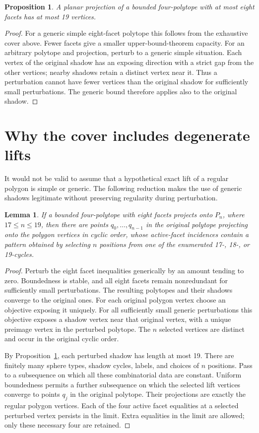 \documentclass[11pt]{article}
\newtheorem{lemma}[theorem]{Lemma}
\newtheorem{proposition}[theorem]{Proposition}
\theoremstyle{definition}
\begin{document}
\begin{proposition}\label{prop:19}
A planar projection of a bounded four-polytope with at most eight facets has at most 19 vertices.
\end{proposition}
\begin{proof}
For a generic simple eight-facet polytope this follows from the exhaustive cover above. Fewer facets give a smaller upper-bound-theorem capacity. For an arbitrary polytope and projection, perturb to a generic simple situation. Each vertex of the original shadow has an exposing direction with a strict gap from the other vertices; nearby shadows retain a distinct vertex near it. Thus a perturbation cannot have fewer vertices than the original shadow for sufficiently small perturbations. The generic bound therefore applies also to the original shadow.
\end{proof}

\section{Why the cover includes degenerate lifts}
It would not be valid to assume that a hypothetical exact lift of a regular polygon is simple or generic. The following reduction makes the use of generic shadows legitimate without preserving regularity during perturbation.

\begin{lemma}\label{lem:limit}
If a bounded four-polytope with eight facets projects onto $P_n$, where $17\le n\le19$, then there are points $q_0,\ldots,q_{n-1}$ in the original polytope projecting onto the polygon vertices in cyclic order, whose active-facet incidences contain a pattern obtained by selecting $n$ positions from one of the enumerated 17-, 18-, or 19-cycles.
\end{lemma}
\begin{proof}
Perturb the eight facet inequalities generically by an amount tending to zero. Boundedness is stable, and all eight facets remain nonredundant for sufficiently small perturbations. The resulting polytopes and their shadows converge to the original ones. For each original polygon vertex choose an objective exposing it uniquely. For all sufficiently small generic perturbations this objective exposes a shadow vertex near that original vertex, with a unique preimage vertex in the perturbed polytope. The $n$ selected vertices are distinct and occur in the original cyclic order.

By Proposition~\ref{prop:19}, each perturbed shadow has length at most 19. There are finitely many sphere types, shadow cycles, labels, and choices of $n$ positions. Pass to a subsequence on which all these combinatorial data are constant. Uniform boundedness permits a further subsequence on which the selected lift vertices converge to points $q_j$ in the original polytope. Their projections are exactly the regular polygon vertices. Each of the four active facet equalities at a selected perturbed vertex persists in the limit. Extra equalities in the limit are allowed; only these necessary four are retained.
\end{proof}
\end{document}
